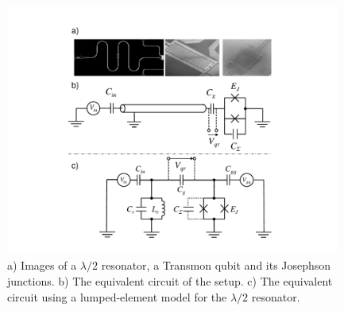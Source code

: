 \begin{figure}
	\includegraphics[width=11cm]{"./material/figures/introduction/cqed/cqed"}
	\caption{a) Images of a $\lambda/2$ resonator, a Transmon qubit and its Josephson junctions. b) The equivalent circuit of the setup. c) The equivalent circuit using a lumped-element model for the $\lambda/2$ resonator.}
	\label{fig:CQED}
\end{figure}


